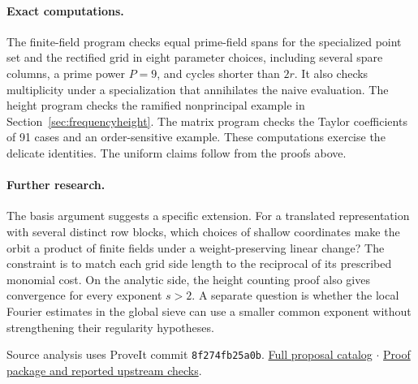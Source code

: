 \documentclass[11pt,letterpaper]{article}
\begin{document}
\paragraph{Exact computations.}
The finite-field program checks equal prime-field spans for the specialized point set and the rectified grid in eight parameter choices, including several spare columns, a prime power $P=9$, and cycles shorter than $2r$. It also checks multiplicity under a specialization that annihilates the naive evaluation. The height program checks the ramified nonprincipal example in Section~\ref{sec:frequencyheight}. The matrix program checks the Taylor coefficients of 91 cases and an order-sensitive example. These computations exercise the delicate identities. The uniform claims follow from the proofs above.
\paragraph{Further research.}
The basis argument suggests a specific extension. For a translated representation with several distinct row blocks, which choices of shallow coordinates make the orbit a product of finite fields under a weight-preserving linear change? The constraint is to match each grid side length to the reciprocal of its prescribed monomial cost. On the analytic side, the height counting proof also gives convergence for every exponent $s>2$. A separate question is whether the local Fourier estimates in the global sieve can use a smaller common exponent without strengthening their regularity hypotheses.
\par\small Source analysis uses ProveIt commit \texttt{8f274fb25a0b}. \href{https://github.com/VladimirReshetnikov/ProveIt/tree/8f274fb25a0be551cbb53ee802033689da108138/Analysis/GeneralizedRiemannHypothesis/docs/proposals}{Full proposal catalog} $\cdot$ \href{https://github.com/VladimirReshetnikov/ProveIt/blob/8f274fb25a0be551cbb53ee802033689da108138/Analysis/GeneralizedRiemannHypothesis/Lean/grh/README.md}{Proof package and reported upstream checks}.
\end{document}
